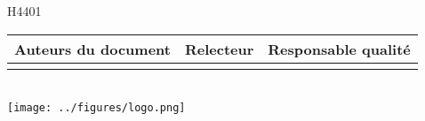 \begin{titlepage}
H4401\\[1cm]


\begin{tabular}{|m{}|m{}|m{}|}
  \hline
  \textbf{Auteurs du document} & \textbf{Relecteur} & \textbf{Responsable qualité} \\
  \hline
   & & \rule[0cm]{0cm}{5cm} \\
  \hline
\end{tabular} \\[2cm]

\texttt{[image: ../figures/logo.png]}

\vfill %

\end{titlepage}

